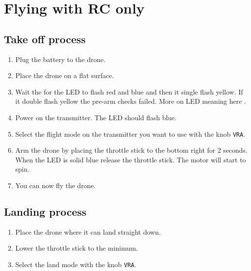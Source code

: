 \section{Flying with RC only}

\subsection{Take off process}
\begin{enumerate}
    \item Plug the battery to the drone.
    \item Place the drone on a flat surface.
    \item Wait the for the LED to flash red and blue and then it single flash yellow. If it double flash yellow the pre-arm checks failed. More on LED meaning here \cite{ardupilot_leds}.
    \item Power on the transmitter. The LED should flash blue.
    \item Select the flight mode on the transmitter you want to use with the knob \texttt{VRA}.
    \item Arm the drone by placing the throttle stick to the bottom right for 2 seconds. When the LED is solid blue release the throttle stick. The motor will start to spin.
    \item You can now fly the drone.
\end{enumerate}

\subsection{Landing process}
\begin{enumerate}
    \item Place the drone where it can land straight down.
    \item Lower the throttle stick to the minimum.
    \item Select the land mode with the knob \texttt{VRA}.
\end{enumerate}

